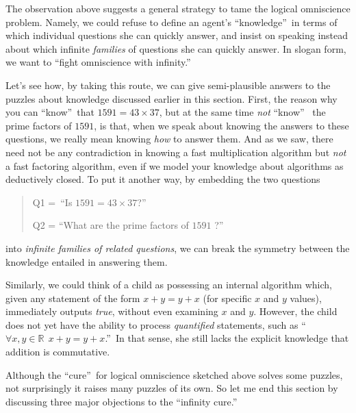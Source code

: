 \documentclass[12pt,onecolumn]{article}%
\begin{document}
The observation above suggests a general strategy to tame the logical
omniscience problem. Namely, we could refuse to define an agent's
\textquotedblleft knowledge\textquotedblright\  in terms of which individual
questions she can quickly answer, and insist on speaking instead about which
infinite \textit{families} of questions she can quickly answer. In slogan
form, we want to \textquotedblleft fight omniscience with
infinity.\textquotedblright\ 

Let's see how, by taking this route, we can give semi-plausible answers to the
puzzles about knowledge discussed earlier in this section. First, the reason
why you can \textquotedblleft know\textquotedblright\  that $1591=43\times37$,
but at the same time \textit{not} \textquotedblleft know\textquotedblright\ %
 the prime factors of $1591$, is that, when we speak about knowing the
answers to these questions, we really mean knowing \textit{how} to answer
them. And as we saw, there need not be any contradiction in knowing a fast
multiplication algorithm but \textit{not} a fast factoring algorithm, even if
we model your knowledge about algorithms as deductively closed. To put it
another way, by embedding the two questions

\begin{quotation}
\noindent Q1 =~\textquotedblleft Is $1591=43\times37$?\textquotedblright\ 

\noindent Q2 = \textquotedblleft What are the prime factors of $1591$%
?\textquotedblright\ 
\end{quotation}

\noindent into \textit{infinite families of related questions}, we can break
the symmetry between the knowledge entailed in answering them.

Similarly, we could think of a child as possessing an internal algorithm
which, given any statement of the form $x+y=y+x$ (for specific $x$ and
$y$ values), immediately outputs \textit{true}, without even examining $x$
and $y$. However, the child does not yet have the ability to process
\textit{quantified} statements, such as \textquotedblleft$\forall
x,y\in\mathbb{R}~~x+y=y+x$.\textquotedblright\  In that sense, she still
lacks the explicit knowledge that addition is commutative.

Although the \textquotedblleft cure\textquotedblright\  for logical
omniscience sketched above solves some puzzles, not surprisingly it raises
many puzzles of its own. So let me end this section by discussing three
major objections to the \textquotedblleft infinity cure.\textquotedblright\ 
\end{document}
